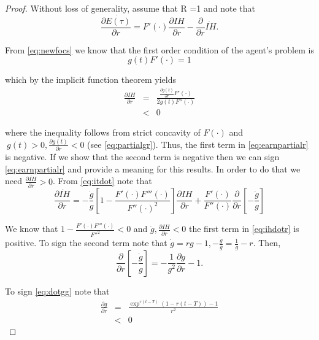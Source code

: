 \begin{proof}
Without loss of generality, assume that R =1 and note that\\
\begin{equation}
\frac{\partial \dot{E(\tau)} }{\partial r} = F'(\cdot) \frac{\partial IH}{\partial r} - \frac{\partial}{\partial r} \dot{IH}. \label{eq:earnpartialr}
\end{equation}

\noindent From \eqref{eq:newfocs} we know that the first order condition of the agent's problem is
\begin{equation}
g(t) F'(\cdot) = 1
\end{equation}

\noindent which by the implicit function theorem yields
\begin{eqnarray}
\frac{\partial IH}{\partial r} &=& \frac{\frac{\partial g(t)}{\partial r} F'(\cdot)}{2 g(t) F''(\cdot)} \nonumber \\ 
&<& 0
\end{eqnarray}

\noindent where the inequality follows from strict concavity of $F(\cdot)$ and  $\ g(t) > 0, \frac{\partial g(t)}{ \partial r} <0$ (see \eqref{eq:partialgr}). Thus, the first term in \eqref{eq:earnpartialr} is negative. If we show that the second term is negative then we can sign \eqref{eq:earnpartialr} and provide a meaning for this results. In order to do that we need $\frac{\partial \dot{IH}}{\partial r} > 0$. From \eqref{eq:itdot} note that 
\begin{equation}
\frac{\partial \dot{IH}}{\partial r} = -\frac{\dot{g}}{g} \left[ 1 - \frac{F'(\cdot)F'''(\cdot)}{{F''(\cdot)}^2}\right] \frac{\partial IH}{\partial r} + \frac{F'(\cdot)}{F''(\cdot)}\frac{\partial}{\partial r} \left[ - \frac{\dot{g}}{g} \right] \label{eq:ihdotr}
\end{equation}

\indent We know that $1 - \frac{F'(\cdot) F'''(\cdot)}{{F''}^2} < 0$ and $\dot{g}, \frac{\partial IH}{\partial r} < 0$  the first term in \eqref{eq:ihdotr} is positive. To sign the second term note that $\dot{g} = rg - 1, - \frac{\dot{g}}{g} = \frac{1}{g} - r$. Then,
\begin{equation}
\frac{\partial}{\partial r} \left[ - \frac{\dot{g}}{g} \right] = - \frac{1}{g^2} \frac{\partial g}{\partial r} - 1. \label{eq:dotgg}
\end{equation}

\indent To sign \eqref{eq:dotgg} note that
\begin{eqnarray}
\frac{\partial g}{\partial r} &=& \frac{\exp^{r(t-T)} \left( 1 - r(t - T) \right) - 1 }{r^2} \nonumber \\
&<& 0 \label{eq:partialgr}
\end{eqnarray}


\end{proof}
